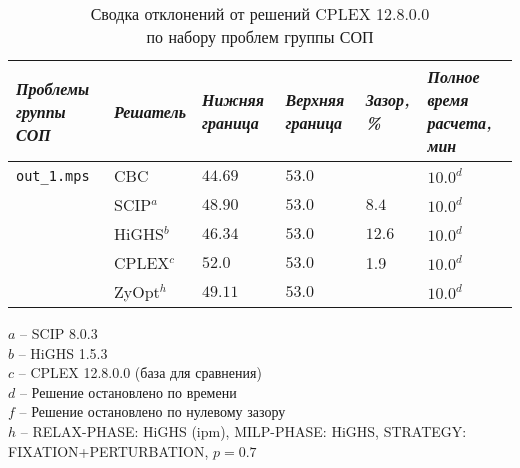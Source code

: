 \documentclass[%
	11pt,
	a4paper,
	utf8,
		]{article}
\begin{document}
\begin{landscape}
	{%
		\begin{table}[!h]
			\centering
			\caption{Сводка отклонений от решений CPLEX 12.8.0.0\\ по набору проблем группы СОП}
			\begin{tabular}{ p{3.3cm} | p{1.8cm} | p{1.8cm} | p{1.8cm} | p{1.6cm} | p{2.6cm} }
				\emph{Проблемы группы СОП} & \emph{Решатель} & \emph{Нижняя граница} & \emph{Верхняя граница} & \emph{Зазор, \%} & \emph{Полное время расчета, мин} \\
				\hline\hline
				\rowcolor{blue!3}\texttt{out\_1.mps} & CBC & $ 44.69 $ & $ 53.0 $ & \ccb{$ 18.6 $} & $ 10.0^d $ \\
				\rowcolor{black!5}{$ - $} & SCIP$^a $ & $ 48.90 $ & $ 53.0 $ & $ 8.4 $ & $ 10.0^d $ \\
				\rowcolor{blue!3}{$ - $} & HiGHS$^b $ & $ 46.34 $ & $ 53.0 $ & $ 12.6 $ & $ 10.0^d $ \\
				\rowcolor{black!5}{$ - $} & CPLEX$^c $& $ 52.0 $ & $ 53.0 $ & 1.9 & $ 10.0^d $ \\
				\rowcolor{blue!3}{$ - $} & ZyOpt$ ^h $ & $ 49.11 $ & $ 53.0 $ & \ccg{$ 7.13 $} & $ 10.0^d $ \\
			\end{tabular}		
		\end{table}
		\vspace*{-3mm}
		\hspace*{5mm}$ a $ -- {\footnotesize SCIP 8.0.3}\\[-7mm]
		
		\hspace*{5mm}$ b $ -- {\footnotesize HiGHS 1.5.3}\\[-7mm]
		
		\hspace*{5mm}$ c $ -- {\footnotesize CPLEX 12.8.0.0 (база для сравнения)}\\[-7mm]
		
		\hspace*{5mm}$ d $ -- {\footnotesize Решение остановлено по времени}\\[-7mm]
		
		\hspace*{5mm}$ f $ -- {\footnotesize Решение остановлено по нулевому зазору }\\[-6mm]
		
		\hspace*{5mm}$ h $ -- {\footnotesize RELAX-PHASE: HiGHS (ipm), MILP-PHASE: HiGHS, STRATEGY: FIXATION+PERTURBATION, $ p = 0.7 $}\\[-6mm]
	}
\end{landscape}
\end{document}
